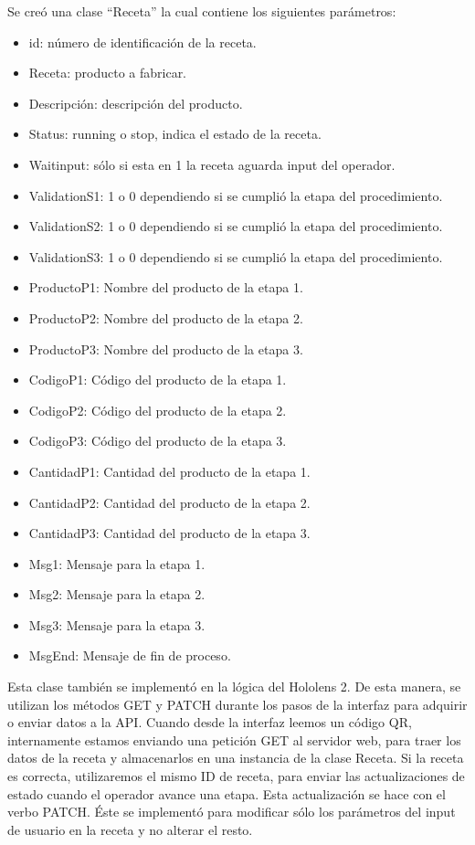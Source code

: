 Se creó una clase ``Receta'' la cual contiene los siguientes parámetros:

\begin{itemize}
\item id: número de identificación de la receta.
\item Receta: producto a fabricar.
\item Descripción: descripción del producto.
\item Status: running o stop, indica el estado de la receta.
\item Waitinput: sólo si esta en 1 la receta aguarda input del operador.
\item ValidationS1: 1 o 0 dependiendo si se cumplió la etapa del procedimiento.
\item ValidationS2: 1 o 0 dependiendo si se cumplió la etapa del procedimiento.
\item ValidationS3: 1 o 0 dependiendo si se cumplió la etapa del procedimiento.
\item ProductoP1: Nombre del producto de la etapa 1.
\item ProductoP2: Nombre del producto de la etapa 2.
\item ProductoP3: Nombre del producto de la etapa 3.
\item CodigoP1: Código del producto de la etapa 1.
\item CodigoP2: Código del producto de la etapa 2.
\item CodigoP3: Código del producto de la etapa 3.
\item CantidadP1: Cantidad del producto de la etapa 1.
\item CantidadP2: Cantidad del producto de la etapa 2.
\item CantidadP3: Cantidad del producto de la etapa 3.
\item Msg1: Mensaje para la etapa 1.
\item Msg2: Mensaje para la etapa 2.
\item Msg3: Mensaje para la etapa 3.
\item MsgEnd: Mensaje de fin de proceso.
\end{itemize}

Esta clase también se implementó en la lógica del Hololens 2. De esta manera, se utilizan los métodos GET y PATCH durante los pasos de la interfaz para adquirir o enviar datos a la API. Cuando desde la interfaz leemos un código QR, internamente estamos enviando una petición GET al servidor web, para traer los datos de la receta y almacenarlos en una instancia de la clase Receta. Si la receta es correcta, utilizaremos el mismo ID de receta, para enviar las actualizaciones de estado cuando el operador avance una etapa. Esta actualización se hace con el verbo PATCH. Éste se implementó para modificar sólo los parámetros del input de usuario en la receta y no alterar el resto. 

